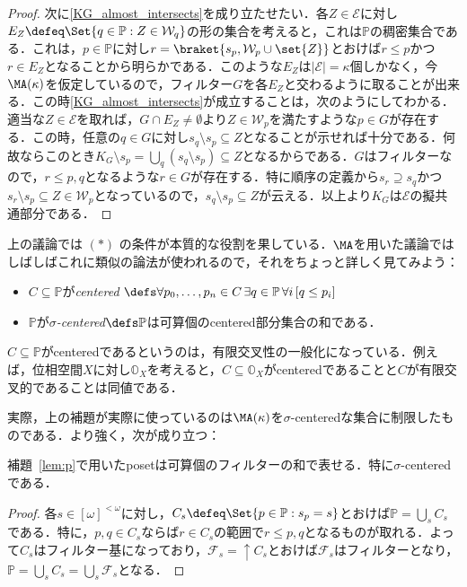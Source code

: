 \documentclass[a4j]{ltjsarticle}
\theoremstyle{definition}
\begin{document}
\begin{proof}
 次に\ref{KG_almost_intersects}を成り立たせたい．各$Z \in \mathcal{E}$に対し$E_Z \defeq \Set{ q \in \mathbb{P} : Z \in \mathcal{W}_q}$の形の集合を考えると，これは$\mathbb{P}$の稠密集合である．これは，$p \in \mathbb{P}$に対し$r = \braket{s_p, \mathcal{W}_p \cup \set{Z}}$とおけば$r \leq p$かつ$r \in E_Z$となることから明らかである．このような$E_Z$は$|\mathcal{E}| = \kappa$個しかなく，今$\MA(\kappa)$を仮定しているので，フィルター$G$を各$E_Z$と交わるように取ることが出来る．この時\ref{KG_almost_intersects}が成立することは，次のようにしてわかる．適当な$Z \in \mathcal{E}$を取れば，$G \cap E_Z \neq \emptyset$より$Z \in \mathcal{W}_p$を満たすような$p \in G$が存在する．この時，任意の$q \in G$に対し$s_q \setminus s_p \subseteq Z$となることが示せれば十分である．何故ならこのとき$K_G \setminus s_p = \bigcup_q (s_q \setminus s_p) \subseteq Z$となるからである．$G$はフィルターなので，$r \leq p, q$となるような$r \in G$が存在する．特に順序の定義から$s_r \supseteq s_q$かつ$s_r \setminus s_p \subseteq Z \in \mathcal{W}_p$となっているので，$s_q \setminus s_p \subseteq Z$が云える．以上より$K_G$は$\mathcal{E}$の擬共通部分である．\mbox{}
\end{proof}

上の議論では $(*)$ の条件が本質的な役割を果している．$\MA$を用いた議論ではしばしばこれに類似の論法が使われるので，それをちょっと詳しく見てみよう：

\begin{definition}
 \begin{itemize}
  \item $C \subseteq \mathbb{P}$が\textit{centered} $\defs \forall p_0, \dots, p_n \in C\, \exists q \in \mathbb{P}\, \forall i\, [q \leq p_i]$
  \item $\mathbb{P}$が\textit{$\sigma$-centered}$\defs \mathbb{P}$は可算個のcentered部分集合の和である．
 \end{itemize}
\end{definition}
$C \subseteq \mathbb{P}$がcenteredであるというのは，有限交叉性の一般化になっている．例えば，位相空間$X$に対し$\mathbb{O}_X$を考えると，$C \subseteq \mathbb{O}_X$がcenteredであることと$C$が有限交叉的であることは同値である．

実際，上の補題が実際に使っているのは$\MA(\kappa)$を$\sigma$-centeredな集合に制限したものである．より強く，次が成り立つ：

\begin{lemma}
 補題~\ref{lem:p}で用いたposetは可算個のフィルターの和で表せる．特に$\sigma$-centeredである．
\end{lemma}
\begin{proof}
 各$s \in [\omega]^{<\omega}$に対し，$C_s \defeq \Set{p \in \mathbb{P} : s_p = s}$とおけば$\mathbb{P} = \bigcup_s C_s$である．特に，$p, q \in C_s$ならば$r \in C_s$の範囲で$r \leq p, q$となるものが取れる．よって$C_s$はフィルター基になっており，$\mathcal{F}_s = \mathop{\uparrow} C_s$とおけば$\mathcal{F}_s$はフィルターとなり，$\mathbb{P} = \bigcup_s C_s = \bigcup_s \mathcal{F}_s$となる．\mbox{}
\end{proof}
\end{document}

